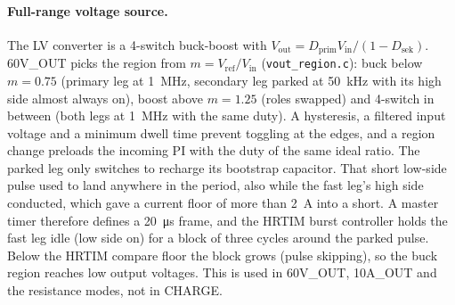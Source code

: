\paragraph{Full-range voltage source.} The LV converter is a 4-switch
buck-boost with $V_\mathrm{out} = D_\mathrm{prim} V_\mathrm{in} / (1 - D_\mathrm{sek})$.
60V\_OUT picks the region from $m = V_\mathrm{ref}/V_\mathrm{in}$
(\texttt{vout\_region.c}): buck below $m = 0.75$ (primary leg at
\qty{1}{\mega\hertz}, secondary leg parked at \qty{50}{\kilo\hertz} with
its high side almost always on), boost above $m = 1.25$ (roles swapped) and
4-switch in between (both legs at \qty{1}{\mega\hertz} with the same duty).
A hysteresis, a filtered input voltage and a minimum dwell time prevent
toggling at the edges, and a region change preloads the incoming PI with the
duty of the same ideal ratio. The parked leg only switches to recharge its
bootstrap capacitor. That short low-side pulse used to land anywhere in the
period, also while the fast leg's high side conducted, which gave a current
floor of more than \qty{2}{\ampere} into a short. A master timer therefore
defines a \qty{20}{\micro\second} frame, and the \ac{HRTIM} burst controller
holds the fast leg idle (low side on) for a block of three cycles around the
parked pulse. Below the \ac{HRTIM} compare floor the block grows (pulse
skipping), so the buck region reaches low output voltages. This is used in
60V\_OUT, 10A\_OUT and the resistance modes, not in CHARGE.

